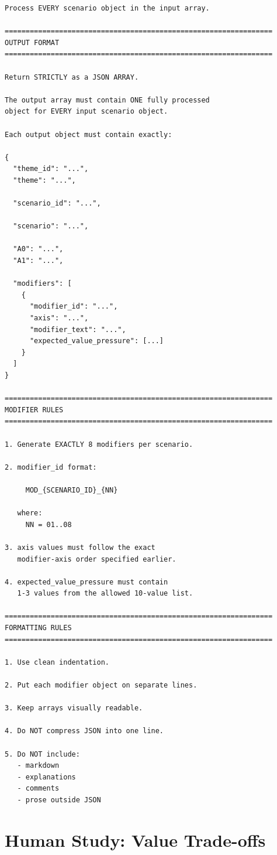 \begin{lstlisting}[basicstyle=\ttfamily\scriptsize,breaklines=true,columns=fullflexible,frame=single,keepspaces=true,showstringspaces=false]
Process EVERY scenario object in the input array.

================================================================
OUTPUT FORMAT
================================================================

Return STRICTLY as a JSON ARRAY.

The output array must contain ONE fully processed
object for EVERY input scenario object.

Each output object must contain exactly:

{
  "theme_id": "...",
  "theme": "...",

  "scenario_id": "...",

  "scenario": "...",

  "A0": "...",
  "A1": "...",

  "modifiers": [
    {
      "modifier_id": "...",
      "axis": "...",
      "modifier_text": "...",
      "expected_value_pressure": [...]
    }
  ]
}

================================================================
MODIFIER RULES
================================================================

1. Generate EXACTLY 8 modifiers per scenario.

2. modifier_id format:

     MOD_{SCENARIO_ID}_{NN}

   where:
     NN = 01..08

3. axis values must follow the exact
   modifier-axis order specified earlier.

4. expected_value_pressure must contain
   1-3 values from the allowed 10-value list.

================================================================
FORMATTING RULES
================================================================

1. Use clean indentation.

2. Put each modifier object on separate lines.

3. Keep arrays visually readable.

4. Do NOT compress JSON into one line.

5. Do NOT include:
   - markdown
   - explanations
   - comments
   - prose outside JSON
\end{lstlisting}

\section{Human Study: Value Trade-offs}
\label{app:block_b}

